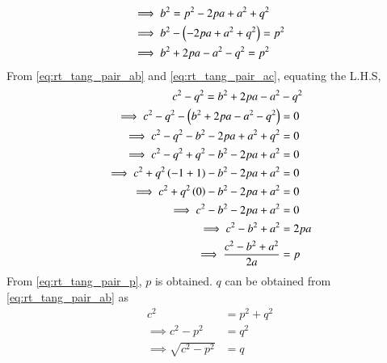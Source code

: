 \documentclass[journal,12pt,twocolumn]{IEEEtran}
\renewcommand\thesection{\arabic{section}}
\begin{document}
\begin{enumerate}[label=\thesection.\arabic*
,ref=\thesection.\theenumi]
\begin{align}
\implies b^2 &=p^2 -2pa + a^2 + q^2
\nonumber \\
\implies b^2 &-\left(-2pa +a^2 +q^2\right) = p^2
\nonumber \\
\implies b^2 &+2pa -a^2 -q^2 = p^2
\label{eq:rt_tang_pair_ac}
\end{align}
From \eqref{eq:rt_tang_pair_ab} and \eqref{eq:rt_tang_pair_ac}, equating the L.H.S,\begin{align}
c^2 -q^2 = b^2 +2pa -a^2 &-q^2
\nonumber \\
\implies c^2 -q^2 -\left( b^2 +2pa -a^2 -q^2\right) &=0
\nonumber \\
\implies c^2 -q^2 - b^2 -2pa +a^2 +q^2 &=0
\nonumber \\
\implies c^2 -q^2+q^2 - b^2 -2pa +a^2  &=0
\nonumber \\
\implies c^2 +q^2\left(-1+1\right) - b^2 -2pa +a^2  &=0
\nonumber \\
\implies c^2 +q^2\left(0\right) - b^2 -2pa +a^2  &=0
\nonumber \\
\implies c^2  - b^2 -2pa +a^2  &=0
\nonumber \\
\implies c^2  - b^2  +a^2  &=2pa
\nonumber\\
\implies \frac{c^2  - b^2  +a^2}{2a}  &=p
\label{eq:rt_tang_pair_p}
\end{align}
%
From \eqref{eq:rt_tang_pair_p}, $p$ is obtained. $q$ can be obtained from 
\eqref{eq:rt_tang_pair_ab} as 
\begin{align}
 c^2 &= p^2+q^2
\nonumber\\ 
\implies c^2 - p^2 &=q^2
\nonumber\\ 
\implies \sqrt{c^2 - p^2} &=q
\end{align}


\end{enumerate}
\end{document}

